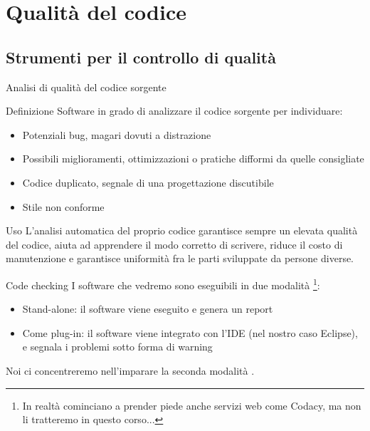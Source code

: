 \documentclass[presentation]{beamer}
\begin{document}
\section{Qualità  del codice}
\subsection{Strumenti per il controllo di qualità}
\begin{frame}{Analisi di qualità  del codice sorgente}
	\begin{block}{Definizione}
		Software in grado di analizzare il codice sorgente per individuare:
		\begin{itemize}
			\item Potenziali bug, magari dovuti a distrazione
			\item Possibili miglioramenti, ottimizzazioni o pratiche difformi da quelle consigliate
			\item Codice duplicato, segnale di una progettazione discutibile
			\item Stile non conforme
		\end{itemize}
	\end{block}
	\begin{block}{Uso}
		L'analisi automatica del proprio codice garantisce sempre un elevata qualità  del codice, aiuta ad apprendere il modo corretto di scrivere, riduce il costo di manutenzione e garantisce uniformità  fra le parti sviluppate da persone diverse.
	\end{block}
\end{frame}

\begin{frame}[allowframebreaks]{Code checking}
	I software che vedremo sono eseguibili in due modalità \footnote{In realtà  cominciano a prender piede anche servizi web come Codacy, ma non li tratteremo in questo corso...}:
	\begin{itemize}
		\item Stand-alone: il software viene eseguito e genera un report
		\item Come plug-in: il software viene integrato con l'IDE (nel nostro caso Eclipse), e segnala i problemi sotto forma di warning
	\end{itemize}
	Noi ci concentreremo nell'imparare la seconda modalità .
\end{frame}
\end{document}
